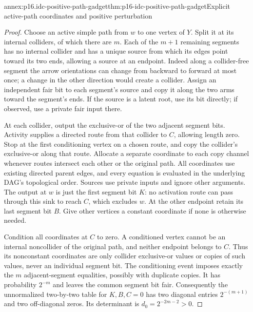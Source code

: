 \begin{annexitem}{annex:p16.idc-positive-path-gadget}{thm:p16-idc-positive-path-gadget}{Explicit active-path coordinates and positive perturbation}
\begin{proof}
Choose an active simple path from \(w\) to one vertex of
\(Y\). Split it at its internal colliders, of which there
are \(m\). Each of the \(m+1\) remaining segments has no
internal collider and has a unique source from which its edges
point toward its two ends, allowing a source at an endpoint.
Indeed along a collider-free segment the arrow orientations can
change from backward to forward at most once; a change in the
other direction would create a collider. Assign an independent
fair bit to each segment's source and copy it along the two
arms toward the segment's ends. If the source is a latent root,
use its bit directly; if observed, use a private fair input there.

At each collider, output the exclusive-or of the two adjacent
segment bits. Activity supplies a directed route from that collider
to \(C\), allowing length zero. Stop at the first conditioning
vertex on a chosen route, and copy the collider's exclusive-or
along that route. Allocate a separate coordinate to each copy
channel whenever routes intersect each other or the original path.
All coordinates use existing directed parent edges, and every
equation is evaluated in the underlying DAG's topological order.
Sources use private inputs and ignore other arguments. The output
at \(w\) is just the first segment bit \(K\): no activation
route can pass through this sink to reach \(C\), which excludes
\(w\). At the other endpoint retain its last segment bit \(B\).
Give other vertices a constant coordinate if none is otherwise needed.

Condition all coordinates at \(C\) to zero. A conditioned
vertex cannot be an internal noncollider of the original path,
and neither endpoint belongs to \(C\). Thus its nonconstant
coordinates are only collider exclusive-or values or copies of
such values, never an individual segment bit. The conditioning
event imposes exactly the \(m\) adjacent-segment equalities,
possibly with duplicate copies. It has probability \(2^{-m}\)
and leaves the common segment bit fair. Consequently the
unnormalized two-by-two table for \(K,B,C=0\) has two diagonal
entries \(2^{-(m+1)}\) and two off-diagonal zeros. Its determinant
is \(d_0=2^{-2m-2}>0\).


\end{proof}
\end{annexitem}
